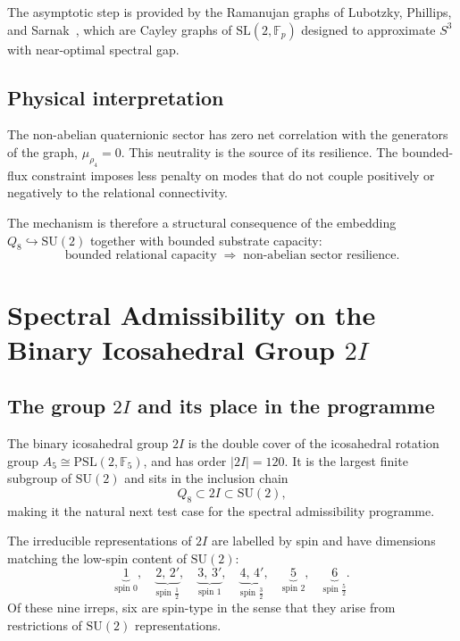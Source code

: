 \documentclass[11pt,a4paper]{article}
\begin{document}
    The asymptotic step is provided by the Ramanujan graphs of
    Lubotzky, Phillips, and Sarnak~\cite{LPS1988}, which are Cayley graphs of
    $\mathrm{SL}(2,\mathbb{F}_p)$ designed to approximate $S^3$ with near-optimal
    spectral gap.

  \subsection{Physical interpretation}
    \label{sec:step4-physics}

    The non-abelian quaternionic sector has zero net correlation with the
    generators of the graph, $\mu_{\rho_4} = 0$.
    This neutrality is the source of its resilience.
    The bounded-flux constraint imposes less penalty on modes that do not couple
    positively or negatively to the relational connectivity.

    The mechanism is therefore a structural consequence of the embedding
    $Q_8 \hookrightarrow \mathrm{SU}(2)$ together with bounded substrate capacity:
    \begin{equation}
      \text{bounded relational capacity}
      \;\Longrightarrow\;
      \text{non-abelian sector resilience}.
    \end{equation}

  \section{Spectral Admissibility on the Binary Icosahedral Group $2I$}
  \label{sec:step5}

  \subsection{The group $2I$ and its place in the programme}
    \label{sec:step5-intro}

    The binary icosahedral group $2I$ is the double cover of the icosahedral
    rotation group $A_5 \cong \mathrm{PSL}(2,\mathbb{F}_5)$, and has order
    $|2I| = 120$.
    It is the largest finite subgroup of $\mathrm{SU}(2)$ and sits in the
    inclusion chain
    \begin{equation}
      Q_8 \subset 2I \subset \mathrm{SU}(2),
      \label{eq:chain}
    \end{equation}
    making it the natural next test case for the spectral admissibility
    programme.

    The irreducible representations of $2I$ are labelled by spin and have
    dimensions matching the low-spin content of $\mathrm{SU}(2)$:
    \begin{equation}
      \underbrace{1}_{\text{spin }0},\quad
      \underbrace{2,\,2'}_{\text{spin }\tfrac{1}{2}},\quad
      \underbrace{3,\,3'}_{\text{spin }1},\quad
      \underbrace{4,\,4'}_{\text{spin }\tfrac{3}{2}},\quad
      \underbrace{5}_{\text{spin }2},\quad
      \underbrace{6}_{\text{spin }\tfrac{5}{2}}.
      \label{eq:2I-irreps}
    \end{equation}
    Of these nine irreps, six are spin-type in the sense that they arise from
    restrictions of $\mathrm{SU}(2)$ representations.
\end{document}
